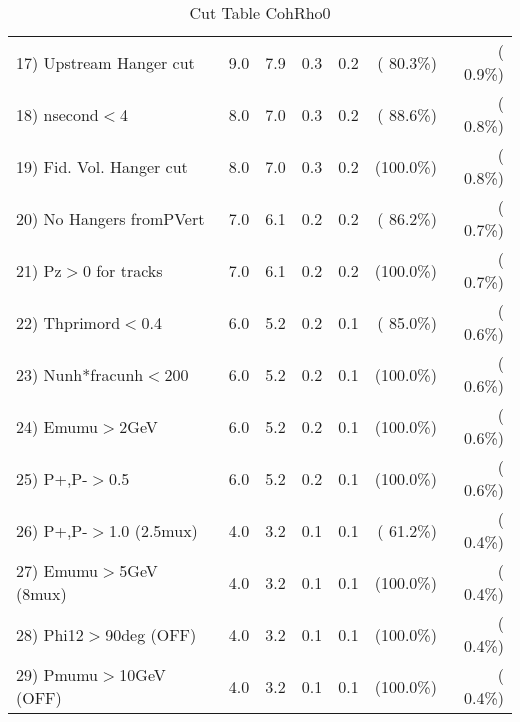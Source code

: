 \begin{table}[h!]
\begin{tabular}{||l||r|r|r|r|r|r||}
 17) Upstream Hanger cut  &          9.0 &          7.9 &          0.3 &          0.2 & ( 80.3\%) & (  0.9\%) \\
 18) nsecond$<$4          &          8.0 &          7.0 &          0.3 &          0.2 & ( 88.6\%) & (  0.8\%) \\
 19) Fid. Vol. Hanger cut &          8.0 &          7.0 &          0.3 &          0.2 & (100.0\%) & (  0.8\%) \\
 20) No Hangers fromPVert &          7.0 &          6.1 &          0.2 &          0.2 & ( 86.2\%) & (  0.7\%) \\
 21) Pz$>$0 for tracks    &          7.0 &          6.1 &          0.2 &          0.2 & (100.0\%) & (  0.7\%) \\
 22) Thprimord$<$0.4      &          6.0 &          5.2 &          0.2 &          0.1 & ( 85.0\%) & (  0.6\%) \\
 23) Nunh*fracunh$<$200   &          6.0 &          5.2 &          0.2 &          0.1 & (100.0\%) & (  0.6\%) \\
 24) Emumu$>$2GeV         &          6.0 &          5.2 &          0.2 &          0.1 & (100.0\%) & (  0.6\%) \\
 25) P+,P-$>$0.5          &          6.0 &          5.2 &          0.2 &          0.1 & (100.0\%) & (  0.6\%) \\
 26) P+,P-$>$1.0 (2.5mux) &          4.0 &          3.2 &          0.1 &          0.1 & ( 61.2\%) & (  0.4\%) \\
 27) Emumu$>$5GeV  (8mux) &          4.0 &          3.2 &          0.1 &          0.1 & (100.0\%) & (  0.4\%) \\
 28) Phi12$>$90deg  (OFF) &          4.0 &          3.2 &          0.1 &          0.1 & (100.0\%) & (  0.4\%) \\
 29) Pmumu$>$10GeV  (OFF) &          4.0 &          3.2 &          0.1 &          0.1 & (100.0\%) & (  0.4\%) \\
 \hline
 \hline
 \end{tabular}
 \caption{Cut Table  CohRho0  }
 \label{tab-cutcohjpsi-mumu_cohrho0}
 \end{table}
